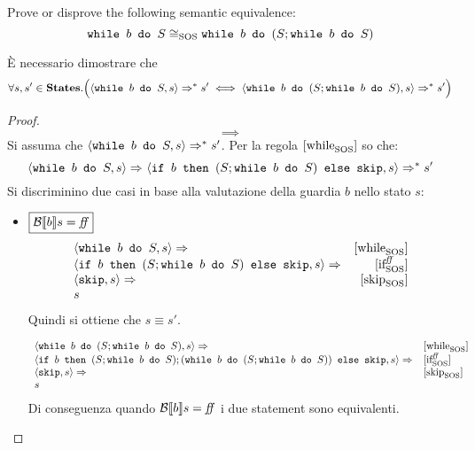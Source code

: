 {Prove or disprove the following semantic equivalence:
$$
\wbS{b}{S} \eqSOS \wbS{b}{(S;\wbS{b}{S})}
$$
}
{
È necessario dimostrare che
$$
\forall s,s' \in \states. \Big(\confSs{\wbS{b}{S}}{s} \Rar{*} s' \iff \confSs{\wbS{b}{(S;\wbS{b}{S})}}{s} \Rar{*} s' \Big)
$$
\begin{proof}
$$
\boxed{\implies}
$$
Si assuma che $\confSs{\wbS{b}{S}}{s} \Rar{*} s'$.
Per la regola $\whileSOS$ so che:
$$
\confSs{\wbS{b}{S}}{s} \Rar{} \confSs{\ifABC{b}{(S; \wbS{b}{S})}{\skipForFriends}}{s} \Rar{*} s'
$$
Si discriminino due casi in base alla valutazione della guardia $b$ nello
stato $s$:
\begin{itemize}
	\item $\boxed{\B{b} = \semfalse}$
	$$
	\begin{array}{lr}
	\confSs{\wbS{b}{S}}{s} \Rar{ } & \whileSOS \\
	\confSs{\ifABC{b}{(S; \wbS{b}{S})}{\skipForFriends}}{s} \Rar{ }& \ifffSOS \\
	\confSs{\skipForFriends}{s} \Rar{} & \skipSOS\\
	s
	\end{array}
	$$
	Quindi si ottiene che $s \equiv{} s'$.
	
	$$
	\begin{array}{ll}
	\confSs{\wbS{b}{(S;\wbS{b}{S})}}{s} \Rar{ } & \whileSOS\\	
	\confSs{\ifABC{b}{(S; \wbS{b}{S}); (\wbS{b}{(S;\wbS{b}{S})})}{\skipForFriends}}{s} \Rar{ } & \ifffSOS \\
	\confSs{\skipForFriends}{s} \Rar{ } & \skipSOS\\
	s
	\end{array}
	$$
	Di conseguenza quando $\B{b} = \semfalse$ i due
	statement sono equivalenti.
	

\end{itemize}
\end{proof}}
